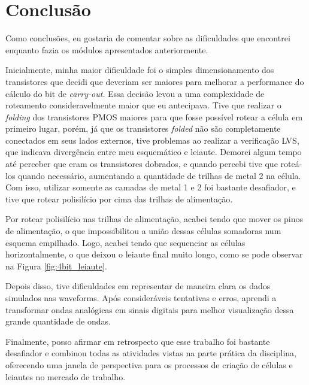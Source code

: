 \documentclass{iiufrgs}
\begin{document}
\chapter{Conclusão}

Como conclusões, eu gostaria de comentar sobre as dificuldades que encontrei enquanto fazia os módulos apresentados anteriormente.

Inicialmente, minha maior dificuldade foi o simples dimensionamento dos transistores que decidi que deveriam ser maiores para melhorar a performance do cálculo do bit de \textit{carry-out}. Essa decisão levou a uma complexidade de roteamento consideravelmente maior que eu antecipava. Tive que realizar o \textit{folding} dos transistores PMOS maiores para que fosse possível rotear a célula em primeiro lugar, porém, já que os transistores \textit{folded} não são completamente conectados em seus lados externos, tive problemas ao realizar a verificação LVS, que indicava divergência entre meu esquemático e leiaute. Demorei algum tempo até perceber que eram os transistores dobrados, e quando percebi tive que roteá-los quando necessário, aumentando a quantidade de trilhas de metal 2 na célula. Com isso, utilizar somente as camadas de metal 1 e 2 foi bastante desafiador, e tive que rotear polisilício por cima das trilhas de alimentação.

Por rotear polisilício nas trilhas de alimentação, acabei tendo que mover os pinos de alimentação, o que impossibilitou a união dessas células somadoras num esquema empilhado. Logo, acabei tendo que sequenciar as células horizontalmente, o que deixou o leiaute final muito longo, como se pode observar na Figura \ref{fig:4bit_leiaute}.

Depois disso, tive dificuldades em representar de maneira clara os dados simulados nas waveforms. Após consideráveis tentativas e erros, aprendi a transformar ondas analógicas em sinais digitais para melhor visualização dessa grande quantidade de ondas.

Finalmente, posso afirmar em retrospecto que esse trabalho foi bastante desafiador e combinou todas as atividades vistas na parte prática da disciplina, oferecendo uma janela de perspectiva para os processos de criação de células e leiautes no mercado de trabalho.


%
% 
\end{document}
